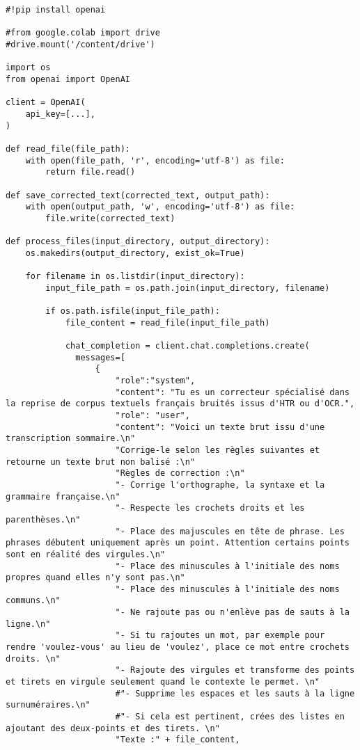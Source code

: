 \begin{verbatim}
#!pip install openai

#from google.colab import drive
#drive.mount('/content/drive')

import os
from openai import OpenAI

client = OpenAI(
    api_key=[...],
)

def read_file(file_path):
    with open(file_path, 'r', encoding='utf-8') as file:
        return file.read()

def save_corrected_text(corrected_text, output_path):
    with open(output_path, 'w', encoding='utf-8') as file:
        file.write(corrected_text)

def process_files(input_directory, output_directory):
    os.makedirs(output_directory, exist_ok=True)

    for filename in os.listdir(input_directory):
        input_file_path = os.path.join(input_directory, filename)

        if os.path.isfile(input_file_path):
            file_content = read_file(input_file_path)

            chat_completion = client.chat.completions.create(
              messages=[
                  {
                      "role":"system",
                      "content": "Tu es un correcteur spécialisé dans la reprise de corpus textuels français bruités issus d'HTR ou d'OCR.",
                      "role": "user",
                      "content": "Voici un texte brut issu d'une transcription sommaire.\n"
                      "Corrige-le selon les règles suivantes et retourne un texte brut non balisé :\n"                      
                      "Règles de correction :\n"
                      "- Corrige l'orthographe, la syntaxe et la grammaire française.\n"
                      "- Respecte les crochets droits et les parenthèses.\n"
                      "- Place des majuscules en tête de phrase. Les phrases débutent uniquement après un point. Attention certains points sont en réalité des virgules.\n"
                      "- Place des minuscules à l'initiale des noms propres quand elles n'y sont pas.\n"
                      "- Place des minuscules à l'initiale des noms communs.\n"
                      "- Ne rajoute pas ou n'enlève pas de sauts à la ligne.\n"
                      "- Si tu rajoutes un mot, par exemple pour rendre 'voulez-vous' au lieu de 'voulez', place ce mot entre crochets droits. \n"                       
                      "- Rajoute des virgules et transforme des points et tirets en virgule seulement quand le contexte le permet. \n" 
                      #"- Supprime les espaces et les sauts à la ligne surnuméraires.\n"
                      #"- Si cela est pertinent, crées des listes en ajoutant des deux-points et des tirets. \n"
                      "Texte :" + file_content,


\end{verbatim}
